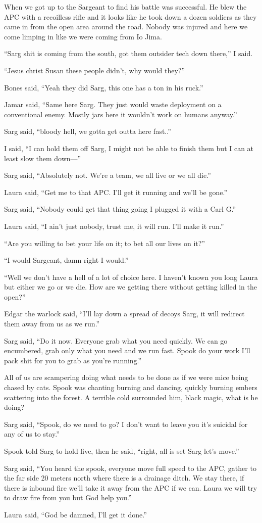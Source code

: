 When we got up to the Sargeant to find his battle was successful. He blew the APC with a recoilless rifle and it looks like he took down a dozen soldiers as they came in from the open area around the road. Nobody was injured and here we come limping in like we were coming from Io Jima.

``Sarg shit is coming from the south, got them outsider tech down there,'' I said.

``Jesus christ Susan these people didn't, why would they?''

Bones said, ``Yeah they did Sarg, this one has a ton in his ruck.''

Jamar said, ``Same here Sarg. They just would waste deployment on a conventional enemy. Mostly jars here it wouldn't work on humans anyway.''

Sarg said, ``bloody hell, we gotta get outta here fast..''

I said, ``I can hold them off Sarg, I might not be able to finish them but I can at least slow them down---''

Sarg said, ``Absolutely not. We're a team, we all live or we all die.''

Laura said, ``Get me to that APC. I'll get it running and we'll be gone.''

Sarg said, ``Nobody could get that thing going I plugged it with a Carl G.''

Laura said, ``I ain't just nobody, trust me, it will run. I'll make it run.''

``Are you willing to bet your life on it; to bet all our lives on it?''

``I would Sargeant, damn right I would.''

``Well we don't have a hell of a lot of choice here. I haven't known you long Laura but either we go or we die. How are we getting there  without getting killed in the open?''

Edgar the warlock said, ``I'll lay down a spread of decoys Sarg, it will redirect them away from us as we run.''

Sarg said, ``Do it now. Everyone grab what you need quickly. We can go encumbered, grab only what you need and we run fast. Spook do your work I'll pack shit for you to grab as you're running.''

All of us are scampering doing what needs to be done as if we were mice being chased by cats. Spook was chanting burning and dancing, quickly burning embers scattering into the forest. A terrible cold surrounded him, black magic, what is he doing?

Sarg said, ``Spook, do we need to go? I don't want to leave you it's suicidal for any of us to stay.''

Spook told Sarg to hold five, then he said, ``right, all is set Sarg let's move.''

Sarg said, ``You heard the spook, everyone move full speed to the APC, gather to the far side 20 meters north where there is a drainage ditch. We stay there, if there is inbound fire we'll take it away from the APC if we can. Laura we will try to draw fire from you but God help you.''

Laura said, ``God be damned, I'll get it done.''



